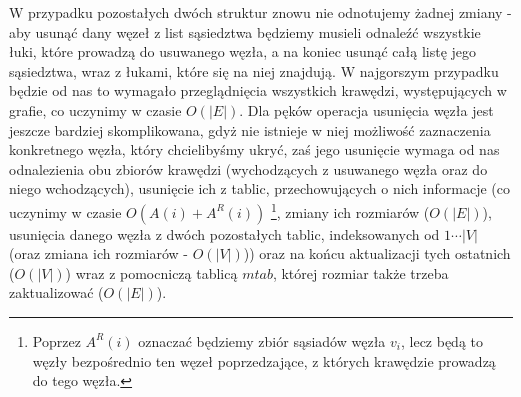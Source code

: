 W przypadku pozostałych dwóch struktur znowu nie odnotujemy żadnej zmiany - aby usunąć dany węzeł z list sąsiedztwa będziemy musieli odnaleźć wszystkie łuki, które prowadzą do usuwanego węzła, a na koniec usunąć całą listę jego sąsiedztwa, wraz z łukami, które się na niej znajdują. W najgorszym przypadku będzie od nas to wymagało przeglądnięcia wszystkich krawędzi, występujących w grafie, co uczynimy w czasie $ O \left( \left| E \right| \right) $. Dla pęków operacja usunięcia węzła jest jeszcze bardziej skomplikowana, gdyż nie istnieje w niej możliwość zaznaczenia konkretnego węzła, który chcielibyśmy ukryć, zaś jego usunięcie wymaga od nas odnalezienia obu zbiorów krawędzi (wychodzących z usuwanego węzła oraz do niego wchodzących), usunięcie ich z tablic, przechowujących o nich informacje (co uczynimy w czasie $ O \left( A \left( i \right) + A^{R} \left( i \right) \right) $ \footnote{Poprzez $A^{R} \left( i \right) $ oznaczać będziemy zbiór sąsiadów węzła $v_{i}$, lecz będą to węzły bezpośrednio ten węzeł poprzedzające, z których krawędzie prowadzą do tego węzła.}, zmiany ich rozmiarów ($ O \left( \left| E \right| \right) $), usunięcia danego węzła z dwóch pozostałych tablic, indeksowanych od $ 1 \cdots \left| V \right| $ (oraz zmiana ich rozmiarów - $ O \left( \left| V \right| \right) $)) oraz na końcu aktualizacji tych ostatnich ($ O \left( \left| V \right| \right) $) wraz z pomocniczą tablicą $mtab$, której rozmiar także trzeba zaktualizować ($ O \left( \left| E \right| \right) $).

